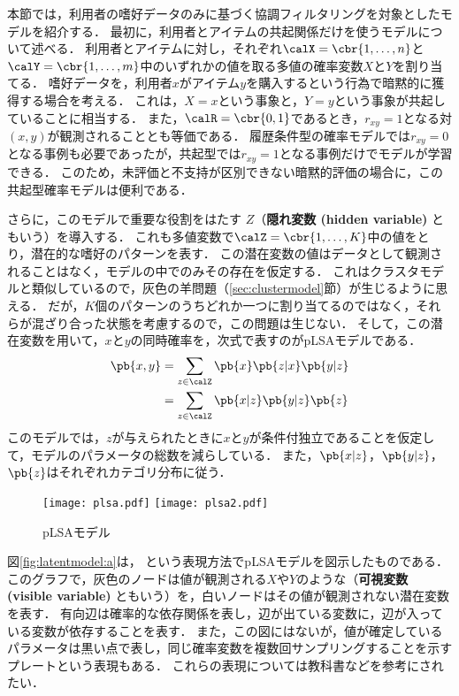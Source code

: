 本節では，利用者の嗜好データのみに基づく協調フィルタリングを対象としたモデル\cite{ijcai:99:01}を紹介する．
最初に，利用者とアイテムの共起関係だけを使うモデルについて述べる．
利用者とアイテムに対し，それぞれ$\calX=\cbr{1,\ldots,n}$と$\calY=\cbr{1,\ldots,m}$中のいずれかの値を取る多値の確率変数$X$と$Y$を割り当てる．
嗜好データを，利用者$x$がアイテム$y$を購入するという行為で暗黙的に獲得する場合を考える．
これは，$X=x$という事象と，$Y=y$という事象が共起していることに相当する．
また，$\calR=\cbr{0,1}$であるとき，$r_{xy}=1$となる対$(x,y)$が観測されることとも等価である．
履歴条件型の確率モデルでは$r_{xy}=0$となる事例も必要であったが，共起型では$r_{xy}=1$となる事例だけでモデルが学習できる．
このため，未評価と不支持が区別できない暗黙的評価の場合に，この共起型確率モデルは便利である．

さらに，このモデルで重要な役割をはたす $Z$（\textbf{隠れ変数 (hidden variable)} ともいう）を導入する．
これも多値変数で$\calZ=\cbr{1,\ldots,K}$中の値をとり，潜在的な嗜好のパターンを表す．
この潜在変数の値はデータとして観測されることはなく，モデルの中でのみその存在を仮定する．
これはクラスタモデルと類似しているので，灰色の羊問題（\ref{sec:clustermodel}節）が生じるように思える．
だが，$K$個のパターンのうちどれか一つに割り当てるのではなく，それらが混ざり合った状態を考慮するので，この問題は生じない．
そして，この潜在変数を用いて，$x$と$y$の同時確率を，次式で表すのがpLSAモデルである．
\begin{align}
 \pb{x,y}& = \sum_{z\in \calZ}\pb{x}\pb{z|x}\pb{y|z}\label{eq:origplsamodel}\\
& = \sum_{z\in \calZ}\pb{x|z}\pb{y|z}\pb{z}
\label{eq:plsamodel}
\end{align}
このモデルでは，$z$が与えられたときに$x$と$y$が条件付独立であることを仮定して，モデルのパラメータの総数を減らしている．
また，$\pb{x|z}$，$\pb{y|z}$，$\pb{z}$はそれぞれカテゴリ分布に従う．

\begin{figure}
\centering
{}%
{\texttt{[image: plsa.pdf]}}%
\hspace{0.1\fullwidth}%
%
{\texttt{[image: plsa2.pdf]}}
\caption{pLSAモデル\cite{ijcai:99:01}}
\label{fig:latentmodel}
\end{figure}

図\ref{fig:latentmodel:a}は， という表現方法でpLSAモデルを図示したものである．
このグラフで，灰色のノードは値が観測される$X$や$Y$のような（\textbf{可視変数 (visible variable)} ともいう）を，白いノードはその値が観測されない潜在変数を表す．
有向辺は確率的な依存関係を表し，辺が出ている変数に，辺が入っている変数が依存することを表す．
また，この図にはないが，値が確定しているパラメータは黒い点で表し，同じ確率変数を複数回サンプリングすることを示すプレートという表現もある．
これらの表現については教科書\cite[8章]{jpublist:077x}などを参考にされたい．


